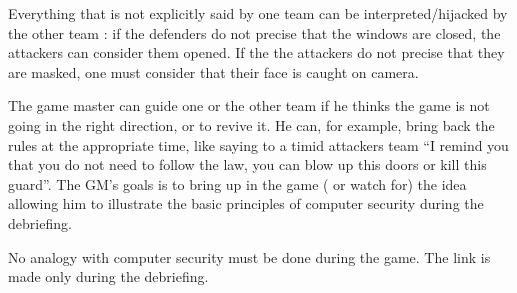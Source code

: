 \documentclass[11pt]{article} %
\begin{document}
Everything that is not explicitly said by one team can be 
interpreted/hijacked by the other team : if the defenders do not 
precise that the windows are closed, the attackers can consider them opened.
If the the attackers do not precise that they are masked, one must 
consider that their face is caught on camera.

%

The game master can guide one or the other team if he thinks the game
is not going in the right direction, or to revive it. He can, for example, 
bring back the rules at the appropriate time, like saying to a 
timid attackers team ``I remind you that you do not need to follow the law, you
can blow up this doors or kill this guard''. The GM's goals is to bring up in the game 
( or watch for) the idea allowing him to illustrate the basic principles of computer 
security during the debriefing.

No analogy with computer security must be done during the game. 
The link is made only during the debriefing.

\end{document}
